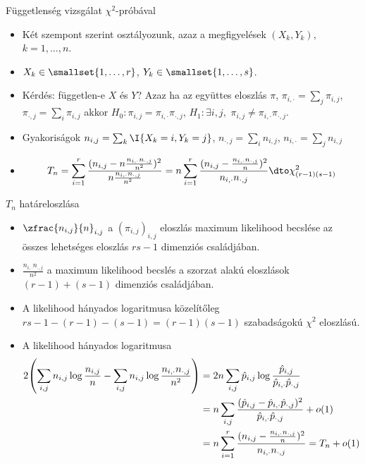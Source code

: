 \documentclass[aspectratio=169,notheorems,9pt,\option]{beamer}
\begin{document}
\begin{frame}{Függetlenség vizsgálat $\chi^2$-próbával}
  \begin{itemize}
    \item Két szempont szerint osztályozunk, azaz a megfigyelések
    $(X_k,Y_k)$, $k=1,\dots,n$.
    \item $X_k\in\smallset{1,\dots,r}$, $Y_k\in\smallset{1,\dots,s}$.
    
    \item Kérdés: független-e $X$ és $Y$? Azaz ha az együttes eloszlás
    $\pi$, $\pi_{i,\cdot}=\sum_j \pi_{i,j}$, $\pi_{\cdot,j}=\sum_i
    \pi_{i,j}$ akkor $H_0:\pi_{i,j}=\pi_{i,\cdot}\pi_{\cdot,j}$,
    $H_1:\exists i,j,\,\,\pi_{i,j}\neq\pi_{i,\cdot}\pi_{\cdot,j}$.
    
    \item Gyakoriságok $n_{i,j}=\sum_{k}\I{X_k=i,Y_k=j}$,
    $n_{\cdot,j}=\sum_{i}n_{i,j}$, $n_{i,\cdot}=\sum_j n_{i,j}$
    \item 
    \begin{displaymath}
      T_n=\sum_{i=1}^r\frac{(n_{i,j}-n\frac{n_{i,\cdot}n_{\cdot,j}}{n^2})^2}{n\frac{n_{i,\cdot}n_{\cdot,j}}{n^2}}=
      n
      \sum_{i=1}^r\frac{(n_{i,j}-\frac{n_{i,\cdot}n_{\cdot,j}}{n})^2}{n_{i,\cdot}n_{\cdot,j}}
      \dto\chi^2_{(r-1) (s-1)}
    \end{displaymath}
    
  \end{itemize}
\end{frame}

\begin{frame}{$T_n$ határeloszlása}
  \begin{itemize}
    \item $\zfrac{n_{i,j}}{n}_{i,j}$ a $(\pi_{i,j})_{i,j}$ eloszlás
    maximum likelihood becslése az összes lehetséges eloszlás
    $rs-1$ dimenziós családjában.
    \item $\frac{n_{i,\cdot}n_{\cdot,j}}{n^2}$ a maximum likelihood
    becslés a szorzat alakú eloszlások $(r-1)+(s-1)$ dimenziós
    családjában. 
    \item A likelihood hányados logaritmusa közelítőleg $rs-1- (r-1) - (s-1)= (r-1)
    (s-1)$ szabadságokú $\chi^2$ eloszlású.
    \item A likelihood hányados logaritmusa
    \begin{align*}
      2\zjel*{\sum_{i,j}n_{i,j}\log\frac{n_{i,j}}n-\sum_{i,j}n_{i,j}\log\frac{n_{i,\cdot}n_{\cdot,j}}{n^2}}
      &=
      2n\sum_{i,j}\hat p_{i,j}\log\frac{\hat p_{i,j}}{\hat p_{i,\cdot}\hat p_{\cdot,j}}\\
      &=n\sum_{i,j}\frac{(\hat p_{i,j}-\hat p_{i,\cdot}\hat
      p_{\cdot,j})^2}{\hat p_{i,\cdot}\hat p_{\cdot,j}}+o (1)
      \\
      &=
      n\sum_{i=1}^r\frac{(n_{i,j}-\frac{n_{i,\cdot}n_{\cdot,j}}{n})^2}{n_{i,\cdot}n_{\cdot,j}}=T_n+o (1)
    \end{align*}
  \end{itemize}
  
\end{frame}
\end{document}
